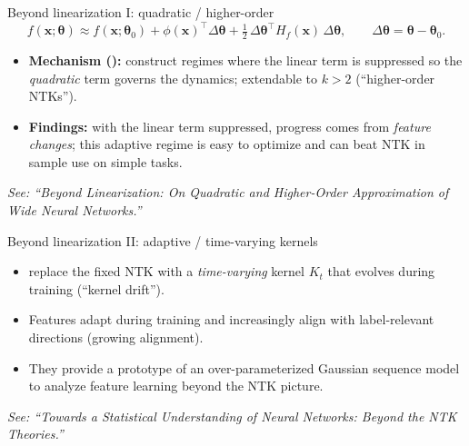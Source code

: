 \documentclass[10pt,aspectratio=169]{beamer}
\newcommand{\btheta}{\boldsymbol{\theta}}
\newcommand{\bx}{\boldsymbol{x}}
\begin{document}
\begin{frame}{Beyond linearization I: quadratic / higher-order}
	\[
		f(\bx;\btheta) \approx f(\bx;\btheta_0)
		+ \phi(\bx)^{\top}\Delta\btheta
		+ \tfrac12\,\Delta\btheta^{\top} H_f(\bx)\,\Delta\btheta,
		\qquad \Delta\btheta=\btheta-\btheta_0.
	\]
	\begin{itemize}
		\item \textbf{Mechanism (\citet{bai2020beyond}):} construct regimes where the linear term is suppressed so the \emph{quadratic} term governs the dynamics; extendable to $k\!>\!2$ (“higher-order NTKs”).
		\item \textbf{Findings:} with the linear term suppressed, progress
		      comes from \emph{feature changes}; this adaptive
		      regime is easy to optimize and can beat NTK in sample use on simple
		      tasks.
	\end{itemize}
	\vspace{0.3em}
	\footnotesize\emph{See: “Beyond Linearization: On Quadratic and Higher-Order Approximation of Wide Neural Networks.”}\normalsize
\end{frame}

\begin{frame}{Beyond linearization II: adaptive / time-varying kernels}
	\begin{itemize}
		\item \citet{zhang2024beyondntk} replace the fixed NTK with a \emph{time-varying} kernel $K_t$ that evolves during training (“kernel drift”).
		\item Features adapt during training and increasingly align with label-relevant directions (growing alignment).
		\item They provide a prototype of an over-parameterized Gaussian sequence model to analyze feature learning beyond the NTK picture.
	\end{itemize}
	\vspace{0.3em}
	\footnotesize\emph{See: “Towards a Statistical Understanding of Neural Networks: Beyond the NTK Theories.”}\normalsize
\end{frame}
\end{document}
